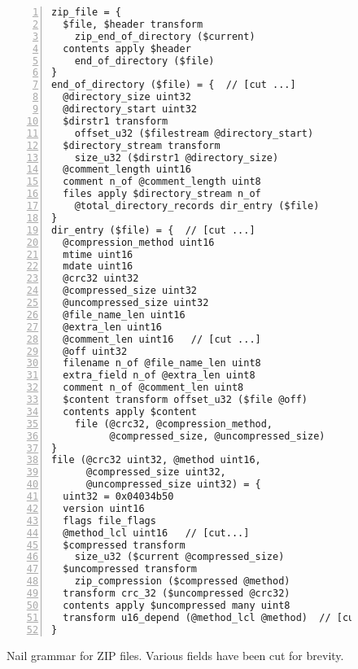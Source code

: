 \begin{figure}
\smaller[1.0]
\begin{Verbatim}[numbers=left, xleftmargin=3em]
zip_file = { 
  $file, $header transform 
    zip_end_of_directory ($current)
  contents apply $header
    end_of_directory ($file)
}
end_of_directory ($file) = {  // [cut ...]
  @directory_size uint32 
  @directory_start uint32
  $dirstr1 transform
    offset_u32 ($filestream @directory_start)
  $directory_stream transform
    size_u32 ($dirstr1 @directory_size)
  @comment_length uint16
  comment n_of @comment_length uint8
  files apply $directory_stream n_of 
    @total_directory_records dir_entry ($file)
}
dir_entry ($file) = {  // [cut ...]
  @compression_method uint16      
  mtime uint16
  mdate uint16
  @crc32 uint32
  @compressed_size uint32
  @uncompressed_size uint32
  @file_name_len uint16
  @extra_len uint16
  @comment_len uint16   // [cut ...]
  @off uint32
  filename n_of @file_name_len uint8
  extra_field n_of @extra_len uint8
  comment n_of @comment_len uint8
  $content transform offset_u32 ($file @off)
  contents apply $content
    file (@crc32, @compression_method,
          @compressed_size, @uncompressed_size)
}
file (@crc32 uint32, @method uint16,
      @compressed_size uint32,
      @uncompressed_size uint32) = {
  uint32 = 0x04034b50
  version uint16
  flags file_flags
  @method_lcl uint16   // [cut...]
  $compressed transform
    size_u32 ($current @compressed_size)
  $uncompressed transform
    zip_compression ($compressed @method)
  transform crc_32 ($uncompressed @crc32)
  contents apply $uncompressed many uint8
  transform u16_depend (@method_lcl @method)  // [cut ...]
}
\end{Verbatim}
\caption{Nail grammar for ZIP files. Various fields have been cut for brevity.}
\label{fig:zip-extract}
\end{figure}
